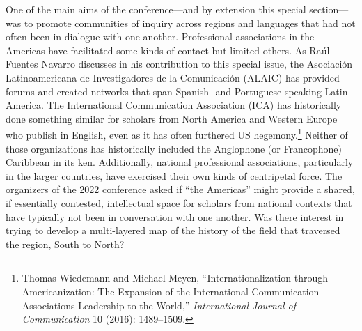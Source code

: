 \documentclass{tufte-handout}
\begin{document}
  \enlargethispage{\baselineskip}

One of the main aims of the conference---and by extension this special
section---was to promote communities of inquiry across regions and
languages that had not often been in dialogue with one another.
Professional associations in the Americas have facilitated some kinds of
contact but limited others. As Raúl Fuentes Navarro discusses in his
contribution to this special issue, the Asociación Latinoamericana de
Investigadores de la Comunicación (ALAIC) has provided forums and
created networks that span Spanish- and Portuguese-speaking Latin
America. The International Communication Association (ICA) has
historically done something similar for scholars from North America and
Western Europe who publish in English, even as it has often furthered US
hegemony.\footnote{Thomas Wiedemann and Michael Meyen,
  ``Internationalization through Americanization: The Expansion of the
  International Communication Association\textquotesingle s Leadership
  to the World,'' \emph{International Journal of Communication} 10
  (2016): 1489--1509.} Neither of those organizations has historically
included the Anglophone (or Francophone) Caribbean in its ken.
Additionally, national professional associations, particularly in the
larger countries, have exercised their own kinds of centripetal force.
The organizers of the 2022 conference asked if ``the Americas'' might
provide a shared, if essentially contested, intellectual space for
scholars from national contexts that have typically not been in
conversation with one another. Was there interest in trying to develop a
multi-layered map of the history of the field that traversed the region,
South to North?
\end{document}
